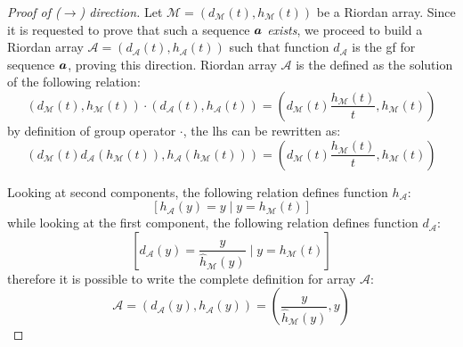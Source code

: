 \begin{proof}[Proof of ($\rightarrow$) direction]
    Let $\mathcal{M}=(d_{\mathcal{M}}(t),h_{\mathcal{M}}(t))$ be a Riordan array. Since it is requested
    to prove that such a sequence $\boldsymbol{a}$ \emph{exists}, we proceed to
    build a Riordan array $\mathcal{A}=(d_{\mathcal{A}}(t),h_{\mathcal{A}}(t))$ such
    that function $d_{\mathcal{A}}$ is the \ac{gf} for sequence $\boldsymbol{a}$, proving this direction.
    Riordan array $\mathcal{A}$ is the defined as the solution of the following relation:
    \begin{displaymath}
        (d_{\mathcal{M}}(t),h_{\mathcal{M}}(t))\cdot(d_{\mathcal{A}}(t),h_{\mathcal{A}}(t))
            = \left(d_{\mathcal{M}}(t)\frac{h_{\mathcal{M}}(t)}{t},h_{\mathcal{M}}(t)\right)
    \end{displaymath}
    by definition of group operator $\cdot$, the \ac{lhs} can be rewritten as:
    \begin{displaymath}
        (d_{\mathcal{M}}(t)d_{\mathcal{A}}(h_{\mathcal{M}}(t)),h_{\mathcal{A}}(h_{\mathcal{M}}(t)))
            = \left(d_{\mathcal{M}}(t)\frac{h_{\mathcal{M}}(t)}{t},h_{\mathcal{M}}(t)\right)
    \end{displaymath}
    
    Looking at second components, the following relation defines function $h_{\mathcal{A}}$:
    \begin{displaymath}
         \left[h_{\mathcal{A}}(y)=y \mid y = h_{\mathcal{M}}(t)\right]
    \end{displaymath}
    while looking at the first component, the following relation defines function $d_{\mathcal{A}}$:
    \begin{displaymath}
         \left[d_{\mathcal{A}}(y)=\frac{y}{\hat{h}_{\mathcal{M}}(y)} \mid y = h_{\mathcal{M}}(t)\right]
    \end{displaymath}
    therefore it is possible to write the complete definition for array $\mathcal{A}$:
    \begin{displaymath}
         \mathcal{A}=(d_{\mathcal{A}}(y),h_{\mathcal{A}}(y))
            =\left(\frac{y}{\hat{h}_{\mathcal{M}}(y)}, y \right)
    \end{displaymath}
    

\end{proof}
